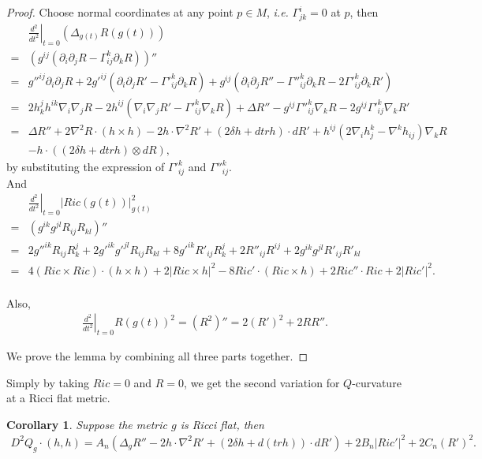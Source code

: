 \documentclass[12pt]{amsart}
\newtheorem{corollary}[theorem]{Corollary}
\theoremstyle{definition}
\theoremstyle{remark}
\numberwithin{equation}{section}
\begin{document}
\begin{proof}
Choose normal coordinates at any point $p \in M$, \emph{i.e.} $\Gamma_{jk}^i = 0$ at $p$, then
\begin{align*}
&\left.\frac{d^2}{dt^2}\right|_{t=0}(\Delta_{g(t)}R(g(t)))\\
=& (g^{ij}(\partial_i\partial_j R - \Gamma_{ij}^k \partial_k R))''\\
=& g''^{ij} \partial_i\partial_j R  + 2 g'^{ij}(\partial_i\partial_j R' - {\Gamma'}_{ij}^k \partial_k R) + g^{ij}(\partial_i\partial_j R'' - {\Gamma''}_{ij}^k \partial_k R - 2{\Gamma'}_{ij}^k \partial_k R')\\
=& 2 h_k^j h^{ik} \nabla_i \nabla_j R - 2 h^{ij} (\nabla_i\nabla_j R' - {\Gamma'}_{ij}^k \nabla_k R) + \Delta R'' - g^{ij} {\Gamma''}_{ij}^k \nabla_k R - 2 g^{ij} {\Gamma'}_{ij}^k \nabla_k R'\\
=& \Delta R'' + 2 \nabla^2 R \cdot (h \times h) - 2 h\cdot \nabla^2 R' + ( 2 \delta h + d trh) \cdot dR' +  h^{ij} ( 2 \nabla_i h_j^k - \nabla^k h_{ij}) \nabla_k R\\
 &- h \cdot ((2 \delta h + d tr h) \otimes d R),
\end{align*}
by substituting the expression of ${\Gamma'}_{ij}^k$ and ${\Gamma''}_{ij}^k$.\\

And
\begin{align*}
&\left.\frac{d^2}{dt^2}\right|_{t=0} |Ric(g(t))|^2_{g(t)}\\
=& \left( g^{ik} g^{jl} R_{ij} R_{kl} \right)''\\
=& 2 g''^{ik}R_{ij} R_k^j + 2 g'^{ik} g'^{jl} R_{ij} R_{kl} + 8 g'^{ik} R'_{ij} R_k^j + 2 R''_{ij} R^{ij} + 2 g^{ik} g^{jl} R'_{ij} R'_{kl}\\
=& 4 (Ric \times Ric) \cdot ( h \times h) + 2 |Ric \times h|^2 - 8 Ric' \cdot (Ric \times h) + 2 Ric'' \cdot Ric + 2|Ric'|^2. \\
\end{align*}

Also,
\begin{align*}
\left.\frac{d^2}{dt^2}\right|_{t=0} R(g(t))^2 = (R^2)'' = 2 (R')^2 + 2 R R''.
\end{align*}

We prove the lemma by combining all three parts together.
\end{proof}

Simply by taking $Ric = 0$ and $R = 0$, we get the second variation for $Q$-curvature at a Ricci flat metric.
\begin{corollary}\label{2nd_variation_Ricci_flat}
Suppose the metric $g$ is Ricci flat, then
\begin{align}
D^2 Q_g \cdot ( h, h )
=A_n(\Delta_{g}R'' - 2 h \cdot \nabla^2 R' + ( 2 \delta h + d (tr h)) \cdot dR') + 2 B_n |Ric'|^2 + 2C_n(R')^2.
\end{align}
\end{corollary}
\end{document}
